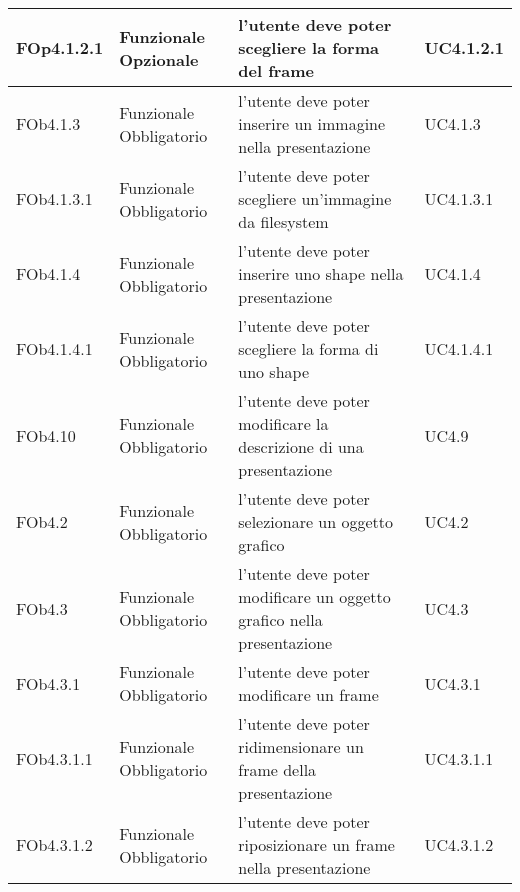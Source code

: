 \begin{longtable}{|l|p{2.5cm}|p{5cm}|p{3.5cm}|}
\hline
FOp4.1.2.1 & Funzionale \linebreak Opzionale & l'utente deve poter scegliere la forma del frame & UC4.1.2.1 \linebreak  \\
\hline
FOb4.1.3 & Funzionale \linebreak Obbligatorio & l'utente deve poter inserire un immagine nella presentazione & UC4.1.3 \linebreak  \\
\hline
FOb4.1.3.1 & Funzionale \linebreak Obbligatorio & l'utente deve poter scegliere un'immagine da filesystem & UC4.1.3.1 \linebreak  \\
\hline
FOb4.1.4 & Funzionale \linebreak Obbligatorio & l'utente deve poter inserire uno shape nella presentazione & UC4.1.4 \linebreak  \\
\hline
FOb4.1.4.1 & Funzionale \linebreak Obbligatorio & l'utente deve poter scegliere la forma di uno shape & UC4.1.4.1 \linebreak  \\
\hline
FOb4.10 & Funzionale \linebreak Obbligatorio & l'utente deve poter modificare la descrizione di una presentazione & UC4.9 \linebreak  \\
\hline
FOb4.2 & Funzionale \linebreak Obbligatorio & l'utente deve poter selezionare un oggetto grafico & UC4.2 \linebreak  \\
\hline
FOb4.3 & Funzionale \linebreak Obbligatorio & l'utente deve poter modificare un oggetto grafico nella presentazione & UC4.3 \linebreak  \\
\hline
FOb4.3.1 & Funzionale \linebreak Obbligatorio & l'utente deve poter modificare un frame & UC4.3.1 \linebreak  \\
\hline
FOb4.3.1.1 & Funzionale \linebreak Obbligatorio & l'utente deve poter ridimensionare un frame della presentazione & UC4.3.1.1 \linebreak  \\
\hline
FOb4.3.1.2 & Funzionale \linebreak Obbligatorio & l'utente deve poter riposizionare un frame nella presentazione & UC4.3.1.2 \linebreak  \\

\end{longtable}
